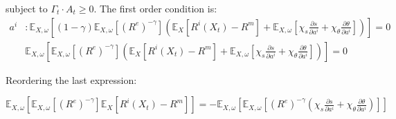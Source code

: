 \begin{flushleft}
{\small subject to $\Gamma_{t}\cdot A_{t}\geq0$. The first order condition
is:}
\begin{align*}
a^{i} & :\mathbb{E}_{X,\omega}\left[\left(1-\gamma\right)\mathbb{E}_{X,\omega}\left[\left(R^{e}\right)^{-\gamma}\right]\left(\mathbb{E}_{X}\left[R^{i}\left(X_{t}\right)-R^{m}\right]+\mathbb{E}_{X,\omega}\left[\chi_{s}\frac{\partial s}{\partial a^{i}}+\chi_{\theta}\frac{\partial\theta}{\partial a^{i}}\right]\right)\right]=0\\
 & \mathbb{E}_{X,\omega}\left[\mathbb{E}_{X,\omega}\left[\left(R^{e}\right)^{-\gamma}\right]\left(\mathbb{E}_{X}\left[R^{i}\left(X_{t}\right)-R^{m}\right]+\mathbb{E}_{X,\omega}\left[\chi_{s}\frac{\partial s}{\partial a^{i}}+\chi_{\theta}\frac{\partial\theta}{\partial a^{i}}\right]\right)\right]=0
\end{align*}
\par\end{flushleft}

\begin{flushleft}
{\small Reordering the last expression:}{\small\par}
\par\end{flushleft}

\begin{center}
$\mathbb{E}_{X,\omega}\left[\mathbb{E}_{X,\omega}\left[\left(R^{e}\right)^{-\gamma}\right]\mathbb{E}_{X}\left[R^{i}\left(X_{t}\right)-R^{m}\right]\right]=-\mathbb{E}_{X,\omega}\left[\mathbb{E}_{X,\omega}\left[\left(R^{e}\right)^{-\gamma}\left(\chi_{s}\frac{\partial s}{\partial a^{i}}+\chi_{\theta}\frac{\partial\theta}{\partial a^{i}}\right)\right]\right]$
\par\end{center}

